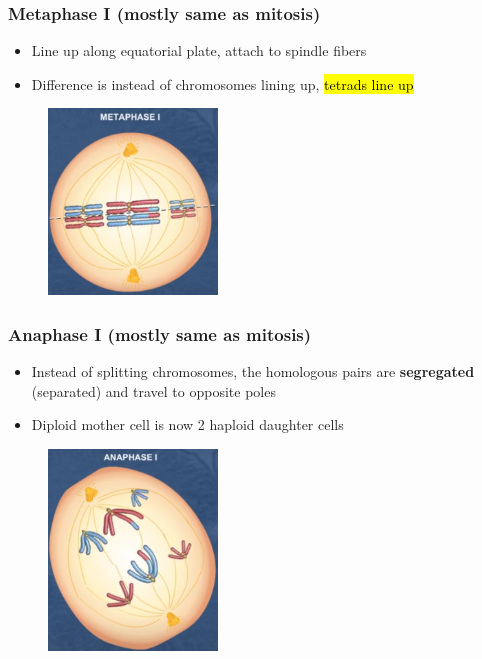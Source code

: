 \documentclass[a4paper,12pt]{article}
\begin{document}
\subsubsection{Metaphase I (mostly same as mitosis)}
\begin{itemize}
    \item{Line up along equatorial plate, attach to spindle fibers}
    \item{Difference is instead of chromosomes lining up, \hl{tetrads line up}}
\end{itemize}

\begin{figure}[H]
    \centering
    \includegraphics[width=0.4\textwidth]{metaphase-i}
\end{figure}

\subsubsection{Anaphase I (mostly same as mitosis)}
\begin{itemize}
    \item{Instead of splitting chromosomes, the homologous pairs are \textbf{segregated} (separated) and travel to opposite poles}
    \item{Diploid mother cell is now 2 haploid daughter cells}
\end{itemize}

\begin{figure}[H]
    \centering
    \includegraphics[width=0.4\textwidth]{anaphase-i}
\end{figure}
\end{document}
